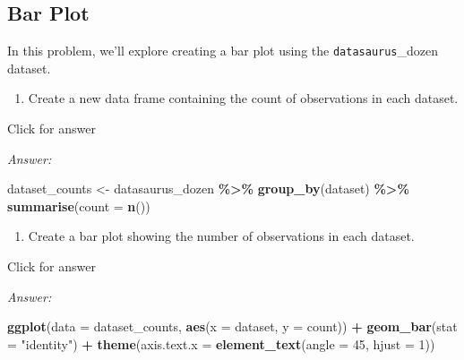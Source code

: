 \documentclass[
]{book}
\newenvironment{Shaded}{\begin{snugshade}}{\end{snugshade}}
\newcommand{\AttributeTok}[1]{\textcolor[rgb]{0.13,0.29,0.53}{#1}}
\newcommand{\DecValTok}[1]{\textcolor[rgb]{0.00,0.00,0.81}{#1}}
\newcommand{\FunctionTok}[1]{\textcolor[rgb]{0.13,0.29,0.53}{\textbf{#1}}}
\newcommand{\NormalTok}[1]{#1}
\newcommand{\OtherTok}[1]{\textcolor[rgb]{0.56,0.35,0.01}{#1}}
\newcommand{\SpecialCharTok}[1]{\textcolor[rgb]{0.81,0.36,0.00}{\textbf{#1}}}
\newcommand{\StringTok}[1]{\textcolor[rgb]{0.31,0.60,0.02}{#1}}
\providecommand{\tightlist}{%
  \setlength{\itemsep}{0pt}\setlength{\parskip}{0pt}}
\begin{document}
\hypertarget{bar-plot}{%
\subsection{Bar Plot}\label{bar-plot}}

In this problem, we'll explore creating a bar plot using the \texttt{datasaurus}\_dozen dataset.

\begin{enumerate}
\def\labelenumi{\alph{enumi}.}
\tightlist
\item
  Create a new data frame containing the count of observations in each dataset.
\end{enumerate}

Click for answer

\emph{Answer:}

\begin{Shaded}
\begin{Highlighting}[]
\NormalTok{dataset\_counts }\OtherTok{\textless{}{-}}\NormalTok{ datasaurus\_dozen }\SpecialCharTok{\%\textgreater{}\%}
  \FunctionTok{group\_by}\NormalTok{(dataset) }\SpecialCharTok{\%\textgreater{}\%}
  \FunctionTok{summarise}\NormalTok{(}\AttributeTok{count =} \FunctionTok{n}\NormalTok{())}
\end{Highlighting}
\end{Shaded}

\begin{enumerate}
\def\labelenumi{\alph{enumi}.}
\setcounter{enumi}{1}
\tightlist
\item
  Create a bar plot showing the number of observations in each dataset.
\end{enumerate}

Click for answer

\emph{Answer:}

\begin{Shaded}
\begin{Highlighting}[]
\FunctionTok{ggplot}\NormalTok{(}\AttributeTok{data =}\NormalTok{ dataset\_counts, }\FunctionTok{aes}\NormalTok{(}\AttributeTok{x =}\NormalTok{ dataset, }\AttributeTok{y =}\NormalTok{ count)) }\SpecialCharTok{+}
  \FunctionTok{geom\_bar}\NormalTok{(}\AttributeTok{stat =} \StringTok{"identity"}\NormalTok{) }\SpecialCharTok{+}
  \FunctionTok{theme}\NormalTok{(}\AttributeTok{axis.text.x =} \FunctionTok{element\_text}\NormalTok{(}\AttributeTok{angle =} \DecValTok{45}\NormalTok{, }\AttributeTok{hjust =} \DecValTok{1}\NormalTok{)) }
\end{Highlighting}
\end{Shaded}
\end{document}
